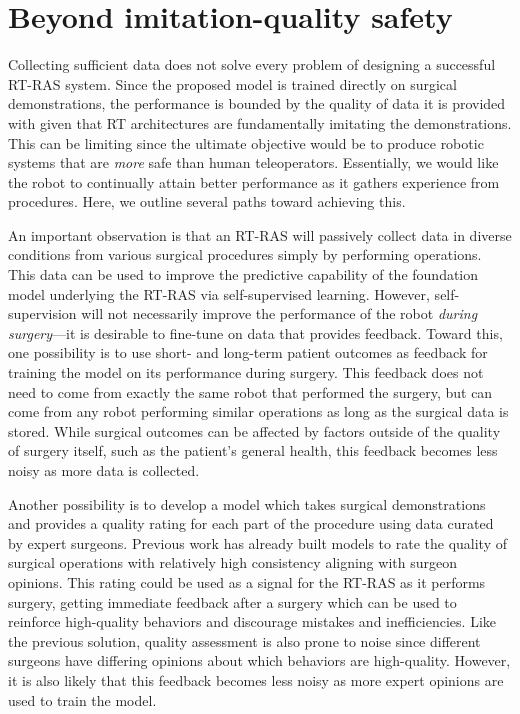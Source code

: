 \documentclass[fleqn,10pt]{wlscirep}\twocolumn
\begin{document}
\section*{Beyond imitation-quality safety} %

Collecting sufficient data does not solve every problem of designing a successful RT-RAS system. 
Since the proposed model is trained directly on surgical demonstrations, the performance is bounded by the quality of data it is provided with given that RT architectures are fundamentally imitating the demonstrations\cite{brohan2022rt}. 
This can be limiting since the ultimate objective would be to produce robotic systems that are \textit{more} safe than human teleoperators. 
Essentially, we would like the robot to continually attain better performance as it gathers experience from procedures. 
Here, we outline several paths toward achieving this.


An important observation is that an RT-RAS will passively collect data in diverse conditions from various surgical procedures simply by performing operations.
This data can be used to improve the predictive capability of the foundation model underlying the RT-RAS via self-supervised learning. 
However, self-supervision will not necessarily improve the performance of the robot \textit{during surgery}---it is desirable to fine-tune on data that provides feedback. 
Toward this, one possibility is to use short- and long-term patient outcomes as feedback for training the model on its performance during surgery. 
This feedback does not need to come from exactly the same robot that performed the surgery, but can come from any robot performing similar operations as long as the surgical data is stored\cite{open_x_embodiment_rt_x_2023}. 
While surgical outcomes can be affected by factors outside of the quality of surgery itself\cite{hsu1998nonsurgical, benoist2000impact, rosenberger2006psychosocial}, such as the patient's general health, this feedback becomes less noisy as more data is collected.

Another possibility is to develop a model which takes surgical demonstrations and provides a quality rating for each part of the procedure using data curated by expert surgeons.
Previous work has already built models to rate the quality of surgical operations with relatively high consistency aligning with surgeon opinions\cite{lam2022machine,khalid2020evaluation}. 
This rating could be used as a signal for the RT-RAS as it performs surgery, getting immediate feedback after a surgery which can be used to reinforce high-quality behaviors and discourage mistakes and inefficiencies.
Like the previous solution, quality assessment is also prone to noise since different surgeons have differing opinions about which behaviors are high-quality.
However, it is also likely that this feedback becomes less noisy as more expert opinions are used to train the model.
\end{document}
